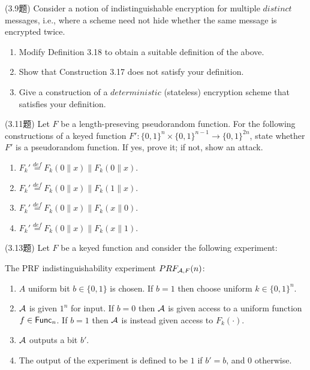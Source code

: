 \begin{questions}
    \question (3.9题) Consider a notion of indistinguishable encryption for multiple $distinct$ messages, i.e., where a scheme need not hide whether the same message is encrypted twice.

        \begin{enumerate}
            \item Modify Definition 3.18 to obtain a suitable definition of the above.
            \item Show that Construction 3.17 does not satisfy your definition.
            \item Give a construction of a $deterministic$ (stateless) encryption scheme that satisfies your definition.
        \end{enumerate}

        \begin{solution}
        \end{solution}

    \question (3.11题) Let $F$ be a length-preseving pseudorandom function. For the following constructions of a keyed function $F':\{0,1\}^n\times\{0,1\}^{n-1}\rightarrow\{0,1\}^{2n}$, state whether $F'$ is a pseudorandom function. If yes, prove it; if not, show an attack.

        \begin{enumerate}
            \item $F_k'\overset{def}=F_k(0\parallel{x})\parallel{F_k}(0\parallel{x})$.
            \item $F_k'\overset{def}=F_k(0\parallel{x})\parallel{F_k}(1\parallel{x})$.
            \item $F_k'\overset{def}=F_k(0\parallel{x})\parallel{F_k}(x\parallel{0})$.
            \item $F_k'\overset{def}=F_k(0\parallel{x})\parallel{F_k}(x\parallel{1})$.
        \end{enumerate}

        \begin{solution}
        \end{solution}

    \question (3.13题) Let $F$ be a keyed function and consider the following experiment:

        \indent The PRF indistinguishability experiment $PRF_{\mathcal{A},F}(n)$:

        \begin{enumerate}
            \item $A$ uniform bit $b\in\{0,1\}$ is chosen. If $b=1$ then choose uniform $k\in\{0,1\}^n$.
            \item $\mathcal{A}$ is given $1^n$ for input. If $b=0$ then $\mathcal{A}$ is given access to a uniform function $f\in\mathsf{Func}_n$. If $b=1$ then $\mathcal{A}$ is instead given access to $F_k(\cdot)$.
            \item $\mathcal{A}$ outputs a bit $b'$.
            \item The output of the experiment is defined to be $1$ if $b'=b$, and $0$ otherwise.
        \end{enumerate}


\end{questions}
